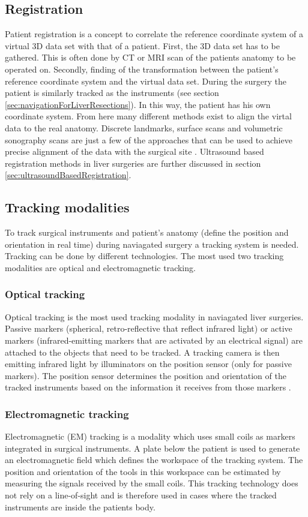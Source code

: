 \subsection{Registration}
Patient registration is a concept to correlate the reference coordinate system
of a virtual 3D data set with that of a patient. First, the 3D data set has to
be gathered. This is often done by CT or MRI scan of the patients anatomy to be
operated on. Secondly, finding of the transformation between the patient's
reference coordinate system and the virtual data set. During the surgery the patient is similarly
tracked as the instruments (see section \ref{sec:navigationForLiverResections}).
In this way, the patient has his own coordinate system. From here many different
methods exist to align the virtal data to the real anatomy.
Discrete landmarks, surface scans and
volumetric sonography scans are just a few of the approaches that can be
used to achieve precise alignment of the data with the
surgical site \cite{banz2016intraoperative}. Ultrasound based registration
methods in liver surgeries are further discussed in section
\ref{sec:ultrasoundBasedRegistration}.

\subsection{Tracking modalities}
To track surgical instruments and patient's anatomy (define the position and
orientation in real time) during naviagated surgery a tracking system is needed.
Tracking can be done by different technologies. The most used two tracking
modalities are optical and electromagnetic tracking.   

\subsubsection{Optical tracking}
Optical tracking is the most used tracking modality in naviagated liver
surgeries. Passive markers (spherical, retro-reflective that reflect infrared
light) or active markers (infrared-emitting markers that are activated by an
electrical signal) \cite{wiles2004accuracy} are attached to the objects that
need to be tracked. A tracking camera is then emitting infrared light by illuminators
on the position sensor (only for passive markers). The position sensor
determines the position and orientation of the tracked instruments based on the
information it receives from those markers \cite{noauthor_polaris_nodate}.  

\subsubsection{Electromagnetic tracking}
Electromagnetic (EM) tracking is a modality which uses small coils as markers
integrated in surgical instruments. A plate below the patient is used to
generate an electromagnetic field which defines the workspace of the tracking
system. The position and orientation of the tools in this workspace can be
estimated by measuring the signals received by the small coils. This tracking technology does not rely on a
line-of-sight and is therefore used in cases where the tracked instruments are
inside the patients body.  
\endinput
